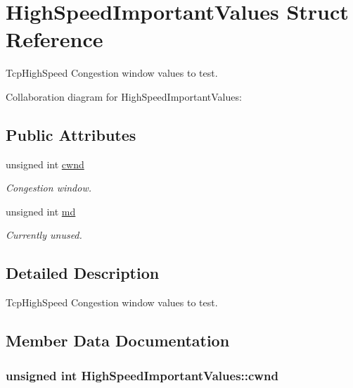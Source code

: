 \hypertarget{structHighSpeedImportantValues}{}\section{High\+Speed\+Important\+Values Struct Reference}
\label{structHighSpeedImportantValues}


Tcp\+High\+Speed Congestion window values to test.  




Collaboration diagram for High\+Speed\+Important\+Values\+:
\subsection*{Public Attributes}
\begin{DoxyCompactItemize}
\item 
unsigned int \hyperlink{structHighSpeedImportantValues_ada9ea98e88a43960ea382042f3bddf6b}{cwnd}
\begin{DoxyCompactList}\small\item\em Congestion window. \end{DoxyCompactList}\item 
unsigned int \hyperlink{structHighSpeedImportantValues_ae071f088a04aed6c82e935bf2dcf2bab}{md}
\begin{DoxyCompactList}\small\item\em Currently unused. \end{DoxyCompactList}\end{DoxyCompactItemize}


\subsection{Detailed Description}
Tcp\+High\+Speed Congestion window values to test. 

\subsection{Member Data Documentation}
\subsubsection[{\texorpdfstring{cwnd}{cwnd}}]{\setlength{\rightskip}{0pt plus 5cm}unsigned int High\+Speed\+Important\+Values\+::cwnd}\hypertarget{structHighSpeedImportantValues_ada9ea98e88a43960ea382042f3bddf6b}{}\label{structHighSpeedImportantValues_ada9ea98e88a43960ea382042f3bddf6b}


